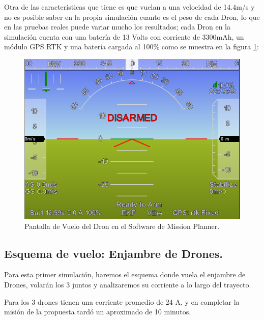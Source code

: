 Otra de las características que tiene es que vuelan a una velocidad de 14.4m/s y no es posible saber en la propia simulación cuanto es el peso de cada Dron, lo que en las pruebas reales puede variar mucho los resultados; cada Dron en la simulación cuenta con una batería de 13 Volts con corriente de 3300mAh, un módulo GPS RTK y una batería cargada al 100\% como se muestra en la figura \ref{fig:Características del Dron}:

\begin{figure}[h]
    \centering
    \includegraphics[width=0.8\linewidth]{imagenes/dron_caracteristicas.png}
    \caption{Pantalla de Vuelo del Dron en el Software de Mission Planner.}
    \label{fig:Características del Dron}
\end{figure}

\newpage

\subsection{Esquema de vuelo: Enjambre de Drones.}
Para esta primer simulación, haremos el esquema donde vuela el enjambre de Drones, volarán los 3 juntos y analizaremos su corriente a lo largo del trayecto.

Para los 3 drones tienen una corriente promedio de 24 A, y en completar la misión de la propuesta tardó un aproximado de 10 minutos.

